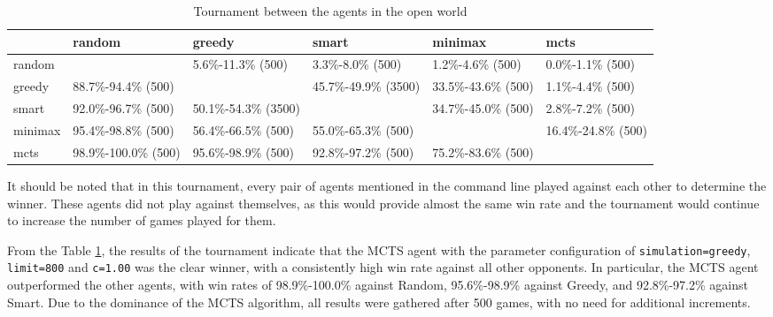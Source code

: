 \begin{table}[]
\captionsetup{justification=centering}
\begin{tabularx}{\textwidth}{|X|X|X|X|X|X|}
\toprule

                                        & random               & greedy               & smart                & minimax & mcts \\ \midrule
random                                  &                      & \footnotesize{5.6\%-11.3\% (500)}   & \footnotesize{3.3\%-8.0\% (500)}    & \footnotesize{1.2\%-4.6\% (500)}            & \footnotesize{0.0\%-1.1\% (500)}                       \\ \midrule
greedy                                  & \footnotesize{88.7\%-94.4\% (500)}  &                      & \footnotesize{45.7\%-49.9\% (3500)} & \footnotesize{33.5\%-43.6\% (500)}          & \footnotesize{1.1\%-4.4\% (500)}                       \\ \midrule
smart                                   & \footnotesize{92.0\%-96.7\% (500)}  & \footnotesize{50.1\%-54.3\% (3500)} &                      & \footnotesize{34.7\%-45.0\% (500)}          & \footnotesize{2.8\%-7.2\% (500)}                       \\ \midrule
minimax            & \footnotesize{95.4\%-98.8\% (500)}  & \footnotesize{56.4\%-66.5\% (500)}  & \footnotesize{55.0\%-65.3\% (500)}  &                              & \footnotesize{16.4\%-24.8\% (500)}                     \\ \midrule
mcts & \footnotesize{98.9\%-100.0\% (500)} & \footnotesize{95.6\%-98.9\% (500)}  & \footnotesize{92.8\%-97.2\% (500)}  & \footnotesize{75.2\%-83.6\% (500)}          &                                         \\ \bottomrule
\end{tabularx}
    \caption{Tournament between the agents in the open world}
    \label{tournamentOpenWorld}
\end{table}

It should be noted that in this tournament, every pair of agents mentioned in the command line played against each other to determine the winner. These agents did not play against themselves, as this would provide almost the same win rate and the tournament would continue to increase the number of games played for them.

From the Table \ref{tournamentOpenWorld}, the results of the tournament indicate that the MCTS agent with the parameter configuration of \texttt{simulation=greedy}, \texttt{limit=800} and \texttt{c=1.00}  was the clear winner, with a consistently high win rate against all other opponents. In particular, the MCTS agent outperformed the other agents, with win rates of 98.9\%-100.0\% against Random, 95.6\%-98.9\% against Greedy, and 92.8\%-97.2\% against Smart. Due to the dominance of the MCTS algorithm, all results were gathered after 500 games, with no need for additional increments.

